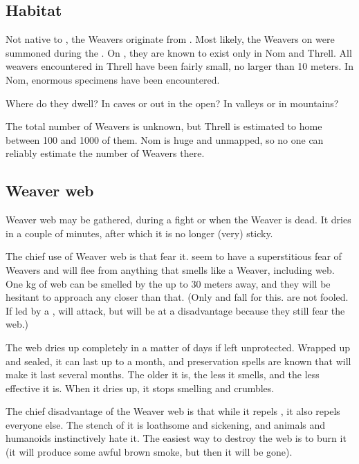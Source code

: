 \subsection{Habitat}
Not native to \Miith{}, the Weavers originate from \Erebos. Most likely, the Weavers on \Miith{} were summoned during the \banewar. On \Miith{}, they are known to exist only in Nom and Threll. All weavers encountered in Threll have been fairly small, no larger than 10 meters. In Nom, enormous specimens have been encountered. 

Where do they dwell? In caves or out in the open? In valleys or in mountains? 

The total number of Weavers is unknown, but Threll is estimated to home between 100 and 1000 of them. Nom is huge and unmapped, so no one can reliably estimate the number of Weavers there. 







\subsection{Weaver web}
Weaver web may be gathered, during a fight or when the Weaver is dead. It dries in a couple of minutes, after which it is no longer (very) sticky. 

The chief use of Weaver web is that \banes{} fear it. \Banes{} seem to have a superstitious fear of Weavers and will flee from anything that smells like a Weaver, including web. One kg of web can be smelled by the \banes{} up to 30 meters away, and they will be hesitant to approach any closer than that. (Only \banespawn{} and \lesserbanes{} fall for this. \Banelords{} are not fooled. If led by a \banelord{}, \lesserbanes{} will attack, but will be at a disadvantage because they still fear the web.) 

The web dries up completely in a matter of days if left unprotected. Wrapped up and sealed, it can last up to a month, and preservation spells are known that will make it last several months. The older it is, the less it smells, and the less effective it is. When it dries up, it stops smelling and crumbles. 

The chief disadvantage of the Weaver web is that while it repels \banes{}, it also repels everyone else. The stench of it is loathsome and sickening, and animals and humanoids instinctively hate it. The easiest way to destroy the web is to burn it (it will produce some awful brown smoke, but then it will be gone).









